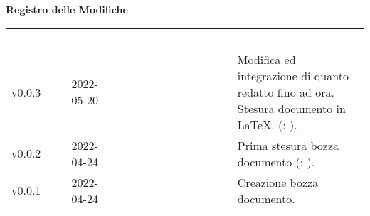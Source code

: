 
{\LARGE{\textbf{Registro delle Modifiche}}} \\
\renewcommand{\arraystretch}{1.5}
\begin{longtable}{ m{}<{\centering}  m{}<{\centering}  m{}<{\centering}  m{}<{\centering}  m{}<{\centering} }
	\rowcolor{darkblue}
	\textcolor{white}{\textbf{Versione}} &\textcolor{white}{\textbf{Data}}& \textcolor{white}{\textbf{Nominativo}} & \textcolor{white}{\textbf{Ruolo}}&\textcolor{white}{\textbf{Descrizione}}\\ 

	v0.0.3 & 2022-05-20 & \GC & \PR & Modifica ed integrazione di quanto redatto fino ad ora. Stesura documento in \LaTeX{}. (\VE: \textit{\PV}). \\

	v0.0.2 & 2022-04-24 & \GC & \PR & Prima stesura bozza documento (\VE: \textit{\PV}). \\

	v0.0.1 & 2022-04-24 & \GC & \PR & Creazione bozza documento. \\

\end{longtable}

\pagebreak